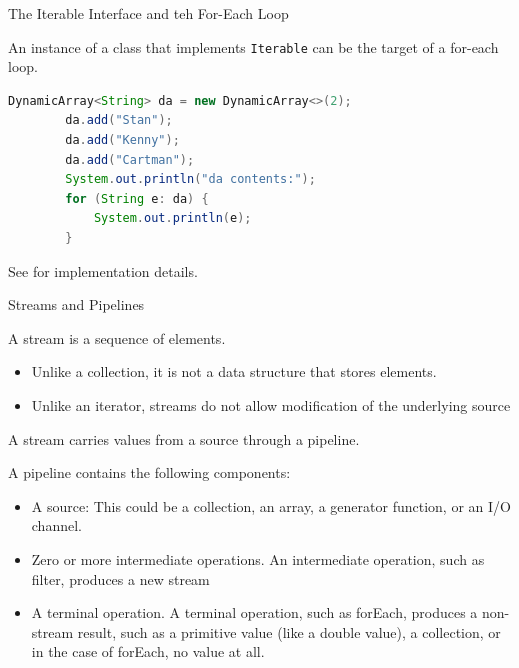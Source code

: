 \documentclass{beamer}
\begin{document}
\begin{frame}[fragile]{The Iterable Interface and teh For-Each Loop}

An instance of a class that implements {\tt Iterable} can be the target of a for-each loop.
\begin{lstlisting}[language=Java]
        DynamicArray<String> da = new DynamicArray<>(2);
        da.add("Stan");
        da.add("Kenny");
        da.add("Cartman");
        System.out.println("da contents:");
        for (String e: da) {
            System.out.println(e);
        }

\end{lstlisting}

See  for implementation details.

\end{frame}

\begin{frame}[fragile]{Streams and Pipelines}

A stream is a sequence of elements.
\begin{itemize}
\item Unlike a collection, it is not a data structure that stores elements.
\item Unlike an iterator, streams do not allow modification of the underlying source
\end{itemize}

A stream carries values from a source through a pipeline.\\

\vspace{.1in}

A pipeline contains the following components:

\begin{itemize}
\item A source: This could be a collection, an array, a generator function, or an I/O channel.
\item Zero or more intermediate operations. An intermediate operation, such as filter, produces a new stream
\item A terminal operation. A terminal operation, such as forEach, produces a non-stream result, such as a primitive value (like a double value), a collection, or in the case of forEach, no value at all.
\end{itemize}

\end{frame}
\end{document}
